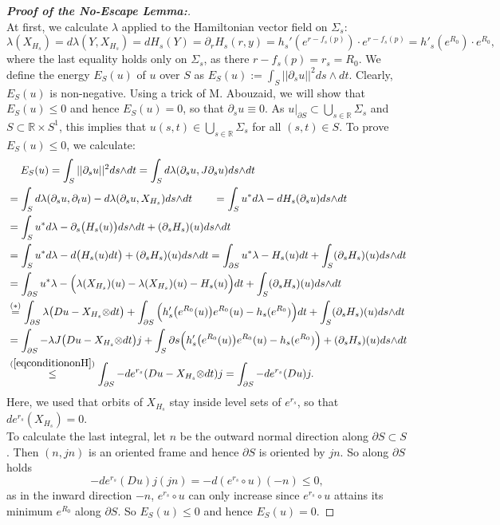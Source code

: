 \documentclass[a4paper,12pt,bibliography=totocnumbered,titlepage=false,abstracton,bookmarksnumbered=true]{scrartcl}
\theoremstyle{definition}
\begin{document}
\begin{proof}[\textbf{Proof of the No-Escape Lemma:}]~\\
 At first, we calculate $\lambda$ applied to the Hamiltonian vector field on $\Sigma_s$:
 \begin{equation*}
  \lambda(X_{H_s})=d\lambda(Y,X_{H_s})=dH_s(Y)=\partial_r H_s(r,y)=h_s'(e^{r-f_s(p)})\cdot e^{r-f_s(p)}=h'_s(e^{R_0})\cdot e^{R_0},\tag{$\ast$}
 \end{equation*}
 where the last equality holds only on $\Sigma_s$, as there $r-f_s(p)=r_s=R_0$. We define the energy $E_S(u)$ of $u$ over $S$ as $E_S(u):=\int_S ||\partial_s u||^2 ds\wedge dt$. Clearly, $E_S(u)$ is non-negative. Using a trick of M. Abouzaid, we will show that $E_S(u)\leq 0$ and hence $E_S(u)=0$, so that $\partial_s u \equiv 0$. As $u|_{\partial S}\subset \bigcup_{s\in\mathbb{R}} \Sigma_s$ and $S\subset \mathbb{R}\times S^1$, this implies that $u(s,t)\in \bigcup_{s\in\mathbb{R}} \Sigma_s$ for all $(s,t)\in S$. To prove $E_S(u)\leq 0$, we calculate:
 \begin{align*}
  &\phantom{\,=\,}\,E_S(u) =\int_S||\partial_s u||^2ds{\wedge} dt =\int_S d\lambda(\partial_s u, J\partial_s u)ds{\wedge} dt\\
  &=\int_S d\lambda(\partial_s u,\partial_t u)-d\lambda(\partial_s u, X_{H_s})ds{\wedge} dt \qquad =\int_S u^\ast d\lambda - dH_s(\partial_s u)ds{\wedge} dt\\
  &=\int_S u^\ast d\lambda -\partial_s \big(H_s(u)\big)ds{\wedge} dt + (\partial_s H_s)(u) ds{\wedge} dt\\
  &=\int_S u^\ast d\lambda- d\big(H_s(u) dt\big) +(\partial_s H_s)(u) ds{\wedge} dt =\int_{\partial S} u^\ast\lambda- H_s(u) dt +\int_S(\partial_s H_s)(u) ds{\wedge} dt\\
  &=\int_{\partial S} u^\ast\lambda-\Big(\lambda(X_{H_s})(u)-\lambda(X_{H_s})(u)-H_s(u)\Big)dt +\int_S(\partial_s H_s)(u) ds{\wedge} dt\\
  &\overset{(\ast)}{=}\int_{\partial S}\lambda\big(Du-X_{H_s}{\otimes} dt\big)+\int_{\partial S}\Big(h'_s\big(e^{R_0}(u)\big) e^{R_0}(u)-h_s(e^{R_0})\Big)dt+\int_S(\partial_s H_s)(u) ds{\wedge} dt\\
  &=\int_{\partial S}-\lambda J\big(Du - X_{H_s}{\otimes} dt\big)j + \int_S\partial s \Big(h'_s\big(e^{R_0}(u)\big) e^{R_0}(u)-h_s(e^{R_0})\Big)+(\partial_s H_s)(u) ds{\wedge} dt\\
  &\overset{(\ref{eqconditiononH})}{\leq}\int_{\partial S}-de^{r_s}(Du-X_{H_s}{\otimes} dt)j=\int_{\partial S}-de^{r_s}(Du)j.
 \end{align*}
Here, we used that orbits of $X_{H_s}$ stay inside level sets of $e^{r_s}$, so that $de^{r_s}(X_{H_s})=0$.\\ To calculate the last integral, let $n$ be the outward normal direction along $\partial S\subset S$. Then $(n,jn)$ is an oriented frame and hence $\partial S$ is oriented by $jn$. So along  $\partial S$ holds
\[-de^{r_s}(Du)j(jn)=-d(e^{r_s}\circ u)(-n)\leq 0,\]
as in the inward direction $-n$, $e^{r_s}\circ u$ can only increase since $e^{r_s}\circ u$ attains its minimum $e^{R_0}$ along $\partial S$. So $E_S(u)\leq 0$ and hence $E_S(u)=0$.
\end{proof}
\end{document}

